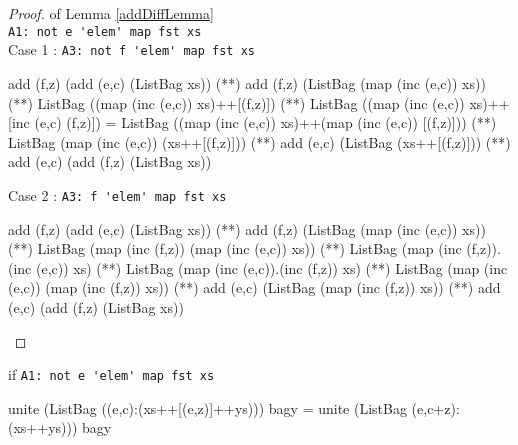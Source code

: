 \begin{proof} of Lemma \ref{addDiffLemma}\\
\verb|A1: not e 'elem' map fst xs|\\
Case 1 : \verb|A3: not f 'elem' map fst xs|
\begin{code}
add (f,z) (add (e,c) (ListBag xs)) 
             (**) add (f,z) (ListBag (map (inc (e,c)) xs))
             (**) ListBag ((map (inc (e,c)) xs)++[(f,z)])
             (**) ListBag ((map (inc (e,c)) xs)++[inc (e,c) (f,z)])
             = ListBag ((map (inc (e,c)) xs)++(map (inc (e,c)) [(f,z)]))
             (**) ListBag (map (inc (e,c)) (xs++[(f,z)]))
             (**) add (e,c) (ListBag (xs++[(f,z)]))
             (**) add (e,c) (add (f,z) (ListBag xs))
\end{code}
Case 2 : \verb|A3: f 'elem' map fst xs|
\begin{code}
add (f,z) (add (e,c) (ListBag xs)) 
             (**) add (f,z) (ListBag (map (inc (e,c)) xs))
             (**) ListBag (map (inc (f,z)) (map (inc (e,c)) xs))
             (**) ListBag (map (inc (f,z)).(inc (e,c)) xs)
             (**) ListBag (map (inc (e,c)).(inc (f,z)) xs)
             (**) ListBag (map (inc (e,c)) (map (inc (f,z)) xs))
             (**) add (e,c) (ListBag (map (inc (f,z)) xs))
             (**) add (e,c) (add (f,z) (ListBag xs))
\end{code}
\end{proof}
\begin{lemma}\label{incLemma}if  \verb|A1: not e 'elem' map fst xs|
\begin{code}
unite (ListBag ((e,c):(xs++[(e,z)]++ys))) bagy 
                 = unite (ListBag (e,c+z):(xs++ys))) bagy
\end{code}
\end{lemma}
